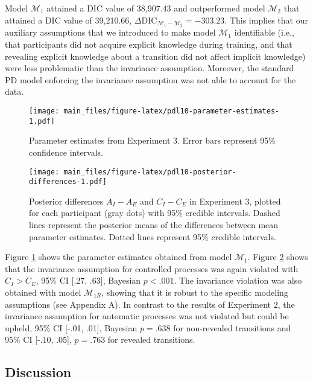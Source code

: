 \documentclass[jou]{apa6}
\theoremstyle{definition}
\theoremstyle{definition}
\theoremstyle{definition}
\theoremstyle{remark}
\begin{document}
Model \(\mathcal{M}_1\) attained a DIC value of 38,907.43 and
outperformed model \(\mathcal{M}_2\) that attained a DIC value of
39,210.66,
\(\Delta \textrm{DIC}_{\mathcal{M}_1 - \mathcal{M}_2} = -303.23\). This
implies that our auxiliary assumptions that we introduced to make model
\(\mathcal{M}_1\) identifiable (i.e., that participants did not acquire
explicit knowledge during training, and that revealing explicit
knowledge about a transition did not affect implicit knowledge) were
less problematic than the invariance assumption. Moreover, the standard
PD model enforcing the invariance assumption was not able to account for
the data.

\begin{figure}[htbp]
\centering
\texttt{[image: main\_files/figure-latex/pdl10-parameter-estimates-1.pdf]}
\caption{\label{fig:pdl10-parameter-estimates}Parameter estimates from
Experiment 3. Error bars represent 95\% confidence intervals.}
\end{figure}

\begin{figure}[htbp]
\centering
\texttt{[image: main\_files/figure-latex/pdl10-posterior-differences-1.pdf]}
\caption{\label{fig:pdl10-posterior-differences}Posterior differences
\(A_I - A_E\) and \(C_I - C_E\) in Experiment 3, plotted for each
participant (gray dots) with 95\% credible intervals. Dashed lines
represent the posterior means of the differences between mean parameter
estimates. Dotted lines represent 95\% credible intervals.}
\end{figure}

Figure \ref{fig:pdl10-parameter-estimates} shows the parameter estimates
obtained from model \(\mathcal{M}_1\). Figure
\ref{fig:pdl10-posterior-differences} shows that the invariance
assumption for controlled processes was again violated with
\(C_I > C_E\), 95\% CI {[}.27, .63{]}, Bayesian \(p < .001\). The
invariance violation was also obtained with model \(\mathcal{M}_{1R}\),
showing that it is robust to the specific modeling assumptions (see
Appendix A). In contrast to the results of Experiment 2, the invariance
assumption for automatic processes was not violated but could be upheld,
95\% CI {[}-.01, .01{]}, Bayesian \(p = .638\) for non-revealed
transitions and 95\% CI {[}-.10, .05{]}, \(p = .763\) for revealed
transitions.

\subsection{Discussion}\label{discussion-2}
\end{document}

